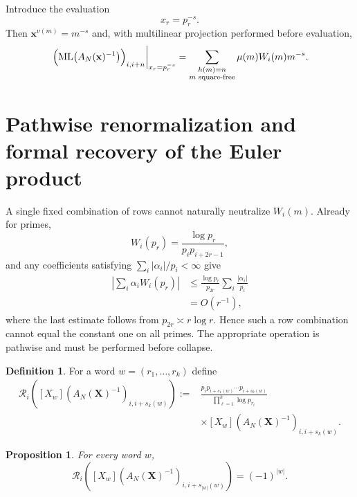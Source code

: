 \documentclass[11pt]{amsart}
\numberwithin{equation}{section}
\theoremstyle{plain}
\newtheorem{proposition}[theorem]{Proposition}
\theoremstyle{definition}
\newtheorem{definition}[theorem]{Definition}
\theoremstyle{remark}
\newcommand{\ML}{\operatorname{ML}}
\begin{document}
Introduce the evaluation
\begin{equation}
x_r=p_r^{-s}.
\label{eq:prime_s_evaluation}
\end{equation}
Then $\mathbf x^{\nu(m)}=m^{-s}$ and, with multilinear projection performed before evaluation,
\begin{equation}
\left.
\Bigl(\ML\bigl(A_N(\mathbf x)^{-1}\bigr)\Bigr)_{i,i+n}
\right|_{x_r=p_r^{-s}}
=
\sum_{\substack{h(m)=n\\m\text{ square-free}}}
\mu(m)W_i(m)m^{-s}.
\label{eq:weighted_mobius_dirichlet}
\end{equation}

\section{Pathwise renormalization and formal recovery of the Euler product}
\label{sec:path_renormalization}

A single fixed combination of rows cannot naturally neutralize $W_i(m)$.  Already for primes,
\begin{equation}
W_i(p_r)=\frac{\log p_r}{p_ip_{i+2r-1}},
\label{eq:Wi_prime}
\end{equation}
and any coefficients satisfying $\sum_i|\alpha_i|/p_i<\infty$ give
\begin{align}
\left|\sum_i\alpha_iW_i(p_r)\right|
&\le \frac{\log p_r}{p_{2r}}\sum_i\frac{|\alpha_i|}{p_i}
\label{eq:row_combination_bound}\\
&=O(r^{-1}),
\label{eq:row_combination_decay}
\end{align}
where the last estimate follows from $p_{2r}\asymp r\log r$.  Hence such a row combination cannot equal the constant one on all primes.  The appropriate operation is pathwise and must be performed before collapse.

\begin{definition}
\label{def:path_renormalization}
For a word $w=(r_1,\ldots,r_k)$ define
\begin{align}
\mathcal R_i\left(
[X_w](A_N(\mathbf X)^{-1})_{i,i+s_k(w)}
\right)
:={}&
\frac{p_i p_{i+s_1(w)}\cdots p_{i+s_k(w)}}
{\prod_{\ell=1}^k\log p_{r_\ell}}
\nonumber\\
&\times [X_w](A_N(\mathbf X)^{-1})_{i,i+s_k(w)}.
\label{eq:path_renormalization}
\end{align}
\end{definition}

\begin{proposition}
\label{prop:renormalized_word}
For every word $w$,
\begin{equation}
\mathcal R_i\left([X_w](A_N(\mathbf X)^{-1})_{i,i+s_{|w|}(w)}\right)=(-1)^{|w|}.
\label{eq:renormalized_word_sign}
\end{equation}
\end{proposition}
\end{document}
